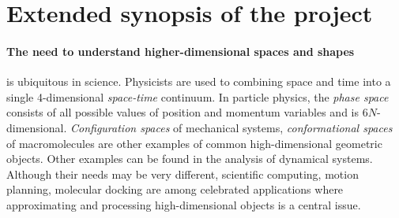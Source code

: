 \section{Extended synopsis of the project}

\paragraph{The need to understand higher-dimensional spaces and shapes}


is ubiquitous in science.  Physicists are used to combining space and time into a single 4-dimensional {\em space-time} continuum.  In particle physics, the {\em phase space} consists of all possible values of position and momentum variables and is $6N$-dimensional.  {\em Configuration spaces} of mechanical systems, {\em conformational spaces} of macromolecules are other examples of common high-dimensional geometric objects.  Other examples can be found in the analysis of  dynamical systems. Although their needs may be very different, scientific computing, motion planning, molecular docking are among celebrated applications where approximating and processing high-dimensional objects is a central issue. 


